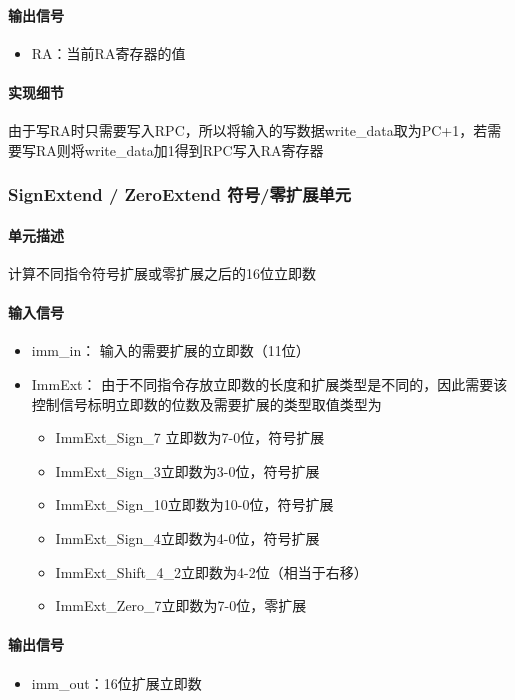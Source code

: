 \documentclass{article}
\begin{document}
\paragraph{输出信号}
\begin{itemize}
	\item RA：当前RA寄存器的值
\end{itemize}
\paragraph{实现细节}
由于写RA时只需要写入RPC，所以将输入的写数据write\_data取为PC+1，若需要写RA则将write\_data加1得到RPC写入RA寄存器

\subsubsection{SignExtend / ZeroExtend 符号/零扩展单元}

\paragraph{单元描述}

计算不同指令符号扩展或零扩展之后的16位立即数

\paragraph{输入信号}
\begin{itemize}
	\item imm\_in： 输入的需要扩展的立即数（11位）
	\item ImmExt： 由于不同指令存放立即数的长度和扩展类型是不同的，因此需要该控制信号标明立即数的位数及需要扩展的类型取值类型为
	\begin{itemize}
	\item ImmExt\_Sign\_7 立即数为7-0位，符号扩展
	\item ImmExt\_Sign\_3立即数为3-0位，符号扩展
	\item ImmExt\_Sign\_10立即数为10-0位，符号扩展
	\item ImmExt\_Sign\_4立即数为4-0位，符号扩展
	\item ImmExt\_Shift\_4\_2立即数为4-2位（相当于右移）
	\item ImmExt\_Zero\_7立即数为7-0位，零扩展
	\end{itemize}
\end{itemize}

\paragraph{输出信号}
\begin{itemize}
	\item imm\_out：16位扩展立即数
\end{itemize}
\end{document}
